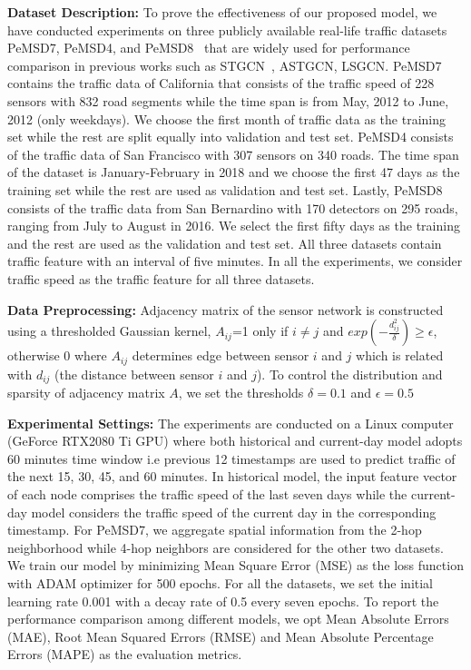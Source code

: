 \documentclass[runningheads]{llncs}
\begin{document}
\noindent
\textbf{Dataset Description:}
To prove the effectiveness of our proposed model, we have conducted experiments on three publicly available real-life traffic datasets  PeMSD7, PeMSD4, and PeMSD8~\cite{ijcai2020-326}
that are widely used for performance comparison in previous works such as STGCN~\cite{yu2017spatio}, ASTGCN\cite{guo2019attention}, LSGCN\cite{ijcai2020-326}. PeMSD7 contains the traffic data of California that consists of the traffic speed of 228 sensors with 832 road segments while the time span is from May, 2012 to June, 2012 (only weekdays). We choose the first month of traffic data as the training set while the rest are split equally into validation and test set. PeMSD4 consists of the traffic data of San Francisco with 307 sensors on 340 roads. The time span of the dataset is January-February in 2018 and we choose the first 47 days as the training set while the rest are used as validation and test set. Lastly,  PeMSD8 consists of the traffic data from San Bernardino with 170 detectors on 295 roads, ranging from July to August in 2016. We select the first fifty days as the training and the rest are used as the validation and test set. All three datasets contain traffic feature with an interval of five minutes. In all the experiments, we consider traffic speed as the traffic feature for all three datasets.


\noindent
\textbf{Data Preprocessing:}
Adjacency matrix of the sensor  network is constructed using a thresholded Gaussian kernel, 
$A_{ij}$=1 only if $i\neq j$ and $exp(- \frac{d^{2}_{ij}}{\delta}) \geq \epsilon$, otherwise 0 where $A_{ij}$ 
determines edge between sensor $i$ and $j$ which is related with $d_{ij}$ (the distance between sensor $i$ and $j$). To control the distribution and sparsity of adjacency matrix $A$, we set the thresholds $\delta = 0.1$ and $\epsilon = 0.5$

\noindent
\textbf{Experimental Settings:}
The experiments are conducted on a Linux computer (GeForce RTX2080 Ti GPU) where both historical and current-day model adopts 60 minutes time window i.e previous 12 timestamps are used to predict  traffic of the next 15, 30, 45, and 60 minutes. In historical model, the input feature vector of each node comprises the traffic speed of the last seven days while the current-day model considers the traffic speed of the current day in the corresponding timestamp. For PeMSD7, we aggregate spatial information from the 2-hop neighborhood while 4-hop neighbors are considered for the other two datasets.
We train our model by minimizing Mean Square Error (MSE) as the loss function with ADAM optimizer for 500 epochs. For all the datasets, we set the initial learning rate 0.001 with a decay rate of 0.5 every seven epochs. To report the performance comparison among different models, we opt Mean Absolute Errors (MAE), Root Mean Squared Errors (RMSE) and Mean Absolute Percentage Errors (MAPE) as the evaluation metrics.
\end{document}
